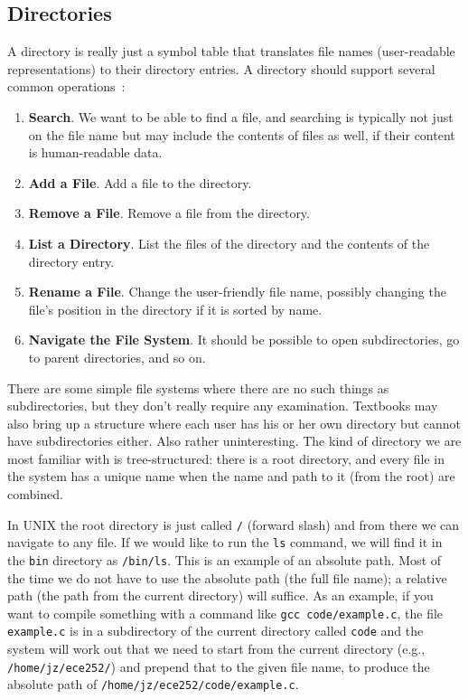 \subsection*{Directories}

A directory is really just a symbol table that translates file names (user-readable representations) to their directory entries. A directory should support several common operations~\cite{osc}:

\begin{enumerate}
	\item \textbf{Search}. We want to be able to find a file, and searching is typically not just on the file name but may include the contents of files as well, if their content is human-readable data.
	\item \textbf{Add a File}. Add a file to the directory.
	\item \textbf{Remove a File}. Remove a file from the directory.
	\item \textbf{List a Directory}. List the files of the directory and the contents of the directory entry.
	\item \textbf{Rename a File}. Change the user-friendly file name, possibly changing the file's position in the directory if it is sorted by name.
	\item \textbf{Navigate the File System}. It should be possible to open subdirectories, go to parent directories, and so on.
\end{enumerate}

There are some simple file systems where there are no such things as subdirectories, but they don't really require any examination. Textbooks may also bring up a structure where each user has his or her own directory but cannot have subdirectories either. Also rather uninteresting. The kind of directory we are most familiar with is tree-structured: there is a root directory, and every file in the system has a unique name when the name and path to it (from the root) are combined.

In UNIX the root directory is just called \texttt{/} (forward slash) and from there we can navigate to any file. If we would like to run the \texttt{ls} command, we will find it in the \texttt{bin} directory as \texttt{/bin/ls}. This is an example of an absolute path. Most of the time we do not have to use the absolute path (the full file name); a relative path (the path from the current directory) will suffice. As an example, if you want to compile something with a command like \texttt{gcc code/example.c}, the file \texttt{example.c} is in a subdirectory of the current directory called \texttt{code} and the system will work out that we need to start from the current directory (e.g., \texttt{/home/jz/ece252/}) and prepend that to the given file name, to produce the absolute path of \texttt{/home/jz/ece252/code/example.c}.

